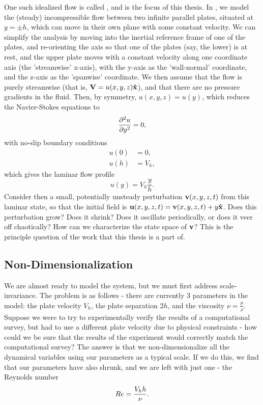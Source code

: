 One such idealized flow is called {\bf \pCf}, and is the focus of this thesis. In \pCf, we model the (steady) incompressible flow between two infinite parallel plates, situated at $y = \pm h$, which can move in their own plane with some constant velocity. We can simplify the analysis by moving into the inertial reference frame of one of the plates, and re-orienting the axis so that one of the plates (say, the lower) is at rest, and the upper plate moves with a constant velocity along one coordinate axis (the 'streamwise' x-axis), with the y-axis as the 'wall-normal' coordinate, and the z-axis as the 'spanwise' coordinate. We then assume that the flow is purely streamwise (that is, $\mathbf{V} = u(x,y,z)\mathbf{\hat{x}}$), and that there are no pressure gradients in the fluid. Then, by symmetry, $u(x,y,z) = u(y)$, which reduces the Navier-Stokes equations to 
\begin{equation}
\pder{2}{u}{y} = 0,
\end{equation}
with no-slip boundary conditions 
\begin{align}
u(0) &= 0,\\
u(h) &= V_h,
\end{align}
which gives the laminar flow profile 
\begin{equation}
u(y) = V_h\frac{y}{h}.
\end{equation}
Consider then a small, potentially unsteady perturbation $\mathbf{v}(x,y,z,t)$ from this laminar state, so that the initial field is $\mathbf{u}(x,y,z,t) = \mathbf{v} (x,y,z,t)+ y\mathbf{\hat{x}}$. Does this perturbation grow? Does it shrink? Does it oscillate periodically, or does it veer off chaotically? How can we characterize the state space of $\mathbf{v}$? This is the principle question of the work that this thesis is a part of. \\

\subsection{Non-Dimensionalization} 
We are almost ready to model the system, but we must first address scale-invariance. The problem is as follows - there are currently 3 parameters in the model: the plate velocity $V_h$, the plate separation $2h$, and the viscosity $\nu = \frac{\mu}{\rho}$. Suppose we were to try to experimentally verify the results of a computational survey, but had to use a different plate velocity due to physical constraints - how could we be sure that the results of the experiment would correctly match the computational survey? The answer is that we non-dimensionalize all the dynamical variables using our parameters as a typical scale. If we do this, we find that our parameters have also shrunk, and we are left with just one - the Reynolds number 
\begin{equation}
Re = \dfrac{V_h h}{\nu}.
\end{equation}

